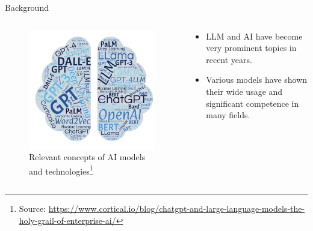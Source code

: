 \documentclass[t]{beamer}
\begin{document}
\begin{frame}{Background}
  \begin{columns}
    \begin{column}{0.4\textwidth}
        \begin{figure}
            \centering
            \includegraphics[width=\textwidth]{llm1.png}
            \caption{Relevant concepts of AI models and technologies\footnote{Source: \url{https://www.cortical.io/blog/chatgpt-and-large-language-models-the-holy-grail-of-enterprise-ai/}}}
            \label{fig:llm1}
        \end{figure}
    \end{column}
    \begin{column}{0.5\textwidth}
        \begin{itemize}
            \item LLM and AI have become very prominent topics in recent years.
            \item Various models have shown their wide usage and significant competence in many fields.
        \end{itemize}
    \end{column}
\end{columns}
\end{frame}
\end{document}
